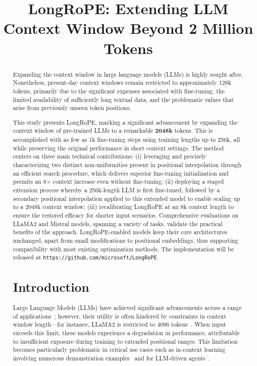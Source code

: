 \title{LongRoPE: Extending LLM Context Window Beyond 2 Million Tokens}

\begin{abstract}
Expanding the context window in large language models (LLMs) is highly sought after. Nonetheless, present-day context windows remain restricted to approximately 128k tokens, primarily due to the significant expenses associated with fine-tuning, the limited availability of sufficiently long textual data, and the problematic values that arise from previously unseen token positions.

This study presents LongRoPE, marking a significant advancement by expanding the context window of pre-trained LLMs to a remarkable \textbf{2048k} tokens. This is accomplished with as few as 1k fine-tuning steps using training lengths up to 256k, all while preserving the original performance in short context settings. The method centers on three main technical contributions: (i) leveraging and precisely characterizing two distinct non-uniformities present in positional interpolation through an efficient search procedure, which delivers superior fine-tuning initialization and permits an 8$\times$ context increase even without fine-tuning; (ii) deploying a staged extension process whereby a 256k-length LLM is first fine-tuned, followed by a secondary positional interpolation applied to this extended model to enable scaling up to a 2048k context window; (iii) recalibrating LongRoPE at an 8k context length to ensure the restored efficacy for shorter input scenarios. Comprehensive evaluations on LLaMA2 and Mistral models, spanning a variety of tasks, validate the practical benefits of the approach. LongRoPE-enabled models keep their core architectures unchanged, apart from small modifications to positional embeddings, thus supporting compatibility with most existing optimization methods. The implementation will be released at \texttt{https://github.com/microsoft/LongRoPE}.

\section{Introduction}

Large Language Models (LLMs) have achieved significant advancements across a range of applications~\cite{gpt4,llama2}; however, their utility is often hindered by constraints in context window length—for instance, LLaMA2 is restricted to 4096 tokens~\cite{llama2}. When input exceeds this limit, these models experience a degradation in performance, attributable to insufficient exposure during training to extended positional ranges. This limitation becomes particularly problematic in critical use cases such as in-context learning involving numerous demonstration examples~\cite{Huang2023FewerIM} and for LLM-driven agents~\cite{park2023generative,madaan2023selfrefine}.


\end{abstract}
